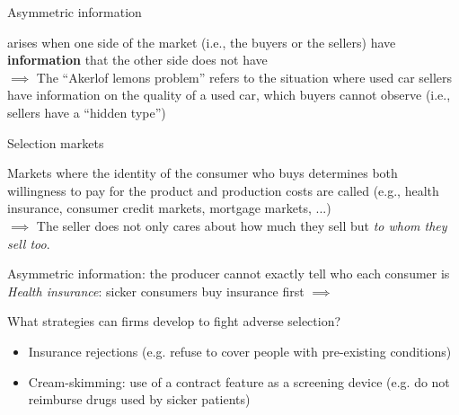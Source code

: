 \begin{frame}{Asymmetric information}

     arises when one side of the market
    (i.e., the buyers or the sellers) have \textbf{information} that the other side does not have\\
    $\implies$ The ``Akerlof lemons problem'' refers to the situation where used car sellers
    have information on the quality of a used car, which buyers cannot observe
    (i.e., sellers have a “hidden type”)

    \vspace{3mm}

    
    
\end{frame}
\begin{frame}{Selection markets}

    Markets where the identity of the consumer who buys determines both willingness to pay for the product and production costs 
    are called  (e.g., health insurance, consumer credit markets, mortgage markets, ...)\\
    $\implies$ The seller does not only cares about how much they sell but \textit{to whom they sell too}.
    \vspace{3mm}

    Asymmetric information: the producer cannot exactly tell who each consumer is\\
    \textit{Health insurance}: sicker consumers buy insurance first $\implies$ 
    \vspace{3mm}

    What strategies can firms develop to fight adverse selection?
    \begin{itemize}
        \item Insurance rejections (e.g. refuse to cover people with pre-existing conditions)
        \item Cream-skimming: use of a contract feature as a screening device (e.g. do not reimburse drugs used by sicker patients)
    \end{itemize}
    
\end{frame}

